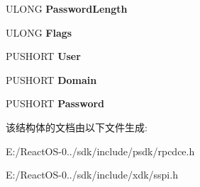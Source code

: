 \begin{DoxyCompactItemize}
U\+L\+O\+NG {\bfseries Password\+Length}
\item 
\mbox{\label{struct___s_e_c___w_i_n_n_t___a_u_t_h___i_d_e_n_t_i_t_y___w_a88965ae772113bc15fe9725ffb18c46b}} 
U\+L\+O\+NG {\bfseries Flags}
\item 
\mbox{\label{struct___s_e_c___w_i_n_n_t___a_u_t_h___i_d_e_n_t_i_t_y___w_a2b5ad3221aa1c1c5f388ab9ab027ecd6}} 
P\+U\+S\+H\+O\+RT {\bfseries User}
\item 
\mbox{\label{struct___s_e_c___w_i_n_n_t___a_u_t_h___i_d_e_n_t_i_t_y___w_a18c8c0fb776b728e1e6681e68b31e59d}} 
P\+U\+S\+H\+O\+RT {\bfseries Domain}
\item 
\mbox{\label{struct___s_e_c___w_i_n_n_t___a_u_t_h___i_d_e_n_t_i_t_y___w_a29863d584cb52c3f309f1e13f874aabc}} 
P\+U\+S\+H\+O\+RT {\bfseries Password}
\end{DoxyCompactItemize}


该结构体的文档由以下文件生成\+:\begin{DoxyCompactItemize}
\item 
E\+:/\+React\+O\+S-\/0../sdk/include/psdk/rpcdce.\+h\item 
E\+:/\+React\+O\+S-\/0../sdk/include/xdk/sspi.\+h\end{DoxyCompactItemize}
